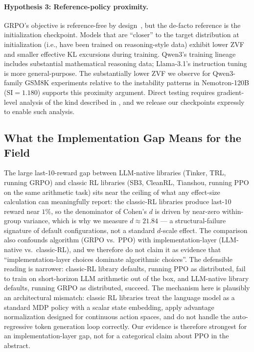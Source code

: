 \documentclass{article}
\begin{document}
\paragraph{Hypothesis 3: Reference-policy proximity.}
GRPO's objective is reference-free by design~\citep{shao2024deepseekmath},
but the de-facto reference is the initialization checkpoint.
Models that are ``closer'' to the target distribution at initialization (i.e.,
have been trained on reasoning-style data) exhibit lower ZVF and smaller
effective KL excursions during training.
Qwen3's training lineage includes substantial mathematical reasoning data;
Llama-3.1's instruction tuning is more general-purpose.
The substantially lower ZVF we observe for Qwen3-family GSM8K experiments
relative to the instability patterns in Nemotron-120B ($\text{SI} = 1.180$)
supports this proximity argument.
Direct testing requires gradient-level analysis of the kind described in
\citet{liu2025rlsubnetworks}, and we release our checkpoints expressly to
enable such analysis.

\subsection{What the Implementation Gap Means for the Field}
\label{sec:discuss_impl}

The large last-10-reward gap between LLM-native libraries (Tinker, TRL,
running GRPO) and classic RL libraries (SB3, CleanRL, Tianshou,
running PPO on the same arithmetic task) sits near the ceiling of
what any effect-size calculation can meaningfully report: the
classic-RL libraries produce last-10 reward near $1\%$, so the
denominator of Cohen's $d$ is driven by near-zero within-group
variance, which is why we measure $d \approx 21.84$ --- a
structural-failure signature of default configurations, not a
standard $d$-scale effect. The comparison also confounds
algorithm (GRPO vs.\ PPO) with implementation-layer (LLM-native vs.\
classic-RL), and we therefore do not claim it as evidence that
``implementation-layer choices dominate algorithmic choices''.
The defensible reading is narrower: classic-RL library defaults,
running PPO as distributed, fail to train on short-horizon LLM
arithmetic out of the box, and LLM-native library defaults,
running GRPO as distributed, succeed.
The mechanism here is plausibly an architectural mismatch: classic RL
libraries treat the language model as a standard MDP policy with a scalar
state embedding, apply advantage normalization designed for continuous action
spaces, and do not handle the auto-regressive token generation loop
correctly. Our evidence is therefore strongest for an implementation-layer gap,
not for a categorical claim about PPO in the abstract.
\end{document}
